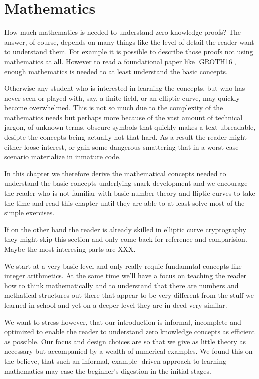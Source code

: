 \chapter{Mathematics}
How much mathematics is needed to understand zero knowledge proofs? The answer, of course, depends on many things like the level of detail the reader want to understand them. For example it is possible to describe those proofs not using mathematics at all. However to read a foundational paper like [GROTH16], enough mathematics is needed to at least understand the basic concepts. 

Otherwise any student who is interested in learning the concepts, but who
has never seen or played with, say, a finite field, or an elliptic curve, may quickly become overwhelmed. This is not so much due to the complexity of the mathematics needs but perhaps more because of the vast amount of technical jargon, of unknown terms, obscure symbols that quickly makes a text ubreadable, desipte the concepts being actually not that hard. As a result the reader might either loose interest, or gain some dangerous smattering that in a worst case scenario materialize in inmature code. 

In this chapter we therefore derive the mathematical concepts needed to understand the basic concepts underlying snark development and we encourage the reader who is not familiar with basic number theory and lliptic curves to take the time and read this chapter until they are able to at least solve most of the simple exercises. 

If on the other hand the reader is already skilled in elliptic curve cryptography they might skip this section and only come back for reference and comparision. Maybe the most interesing parts are XXX.

We start at a very basic level and only really requie fundamntal concepts like integer arithmetics. At the same time we'll have a focus on teaching the reader how to think mathematically and to understand that there are numbers and methatical structures out there that appear to be very different from the stuff we learned in school and yet on a deeper level they are in deed very similar.

We want to stress however, that our introduction is informal, incomplete and optimized to enable the reader to understand zero knowledge concepts as efficient as possible. Our focus and design choices are so that we give as little theory as necessary but accompanied by a wealth of numerical examples. We found this on the believe, that such an informal, example-
driven approach to learning mathematics may ease the beginner’s digestion in the initial stages. 

